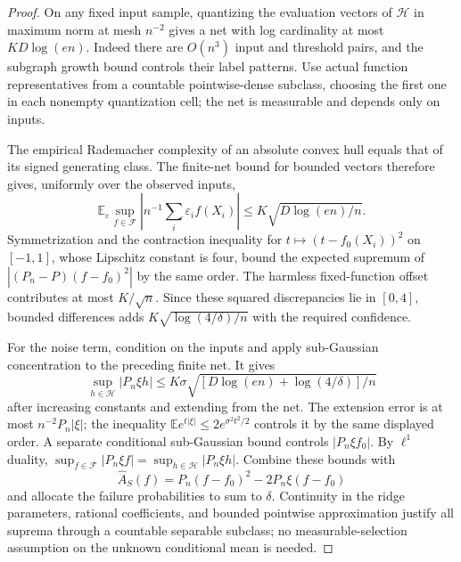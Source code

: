 \begin{proof}
On any fixed input sample, quantizing the evaluation vectors of
$\mathcal H$ in maximum norm at mesh $n^{-2}$ gives a net with log
cardinality at most $KD\log(en)$. Indeed there are $O(n^3)$ input and
threshold pairs, and the subgraph growth bound controls their label
patterns. Use actual function representatives from a countable
pointwise-dense subclass, choosing the first one in each nonempty
quantization cell; the net is measurable and depends only on inputs.

The empirical Rademacher complexity of an absolute convex hull equals
that of its signed generating class. The finite-net bound for bounded
vectors therefore gives, uniformly over the observed inputs,
\[
 \mathbb E_\varepsilon\sup_{f\in\mathcal F}
       \left|n^{-1}\sum_i\varepsilon_i f(X_i)\right|
       \le K\sqrt{D\log(en)/n}.
\]
Symmetrization and the contraction inequality for
$t\mapsto(t-f_0(X_i))^2$ on $[-1,1]$, whose Lipschitz constant is four,
bound the expected supremum of
$|(P_n-P)(f-f_0)^2|$ by the same order. The harmless fixed-function
offset contributes at most $K/\sqrt n$. Since these squared
discrepancies lie in $[0,4]$, bounded differences adds
$K\sqrt{\log(4/\delta)/n}$ with the required confidence.

For the noise term, condition on the inputs and apply sub-Gaussian
concentration to the preceding finite net. It gives
\[
 \sup_{h\in\mathcal H}|P_n\xi h|
       \le K\sigma\sqrt{[D\log(en)+\log(4/\delta)]/n}
\]
after increasing constants and extending from the net. The extension
error is at most $n^{-2}P_n|\xi|$; the inequality
$\mathbb E e^{t|\xi|}\le2e^{\sigma^2t^2/2}$ controls it by the same
displayed order. A separate conditional sub-Gaussian bound controls
$|P_n\xi f_0|$. By $\ell^1$ duality,
$\sup_{f\in\mathcal F}|P_n\xi f|=\sup_{h\in\mathcal H}|P_n\xi h|$.
Combine these bounds with
\[
 \widehat A_S(f)=P_n(f-f_0)^2-2P_n\xi(f-f_0)
\]
and allocate the failure probabilities to sum to $\delta$.
Continuity in the ridge parameters, rational coefficients, and bounded
pointwise approximation justify all suprema through a countable
separable subclass; no measurable-selection assumption on the unknown
conditional mean is needed.
\end{proof}

